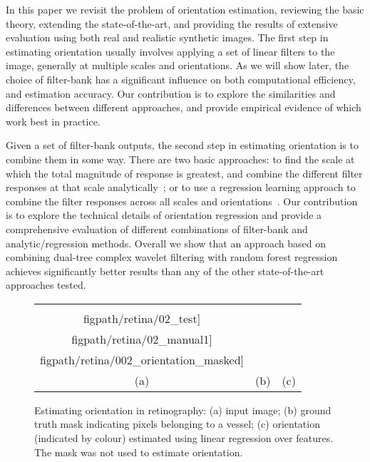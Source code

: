 In this paper we revisit the problem of orientation estimation, reviewing the basic theory, extending the state-of-the-art, and providing the results of extensive evaluation using both real and realistic synthetic images. The first step in estimating orientation usually involves applying a set of linear filters to the image, generally at multiple scales and orientations. As we will show later, the choice of filter-bank has a significant influence on both computational efficiency, and estimation accuracy. Our contribution is to explore the similarities and differences between different approaches, and provide empirical evidence of which work best in practice.

Given a set of filter-bank outputs, the second step in estimating orientation is to combine them in some way. There are two basic approaches: to find the scale at which the total magnitude of response is greatest, and combine the different filter responses at that scale analytically~\cite{Karssemeijer_teBrake_TMI96,Mei_etal_IVC09}; or to use a regression learning approach to combine the filter responses across all scales and orientations~\cite{Berks_etal_IPMI11}. Our contribution is to explore the technical details of orientation regression and provide a comprehensive evaluation of different combinations of filter-bank and analytic/regression methods. Overall we show that an approach based on combining dual-tree complex wavelet filtering with random forest regression achieves significantly better results than any of the other state-of-the-art approaches tested.

\begin{figure}[t]
\centering
\begin{tabular}{c c c}
\texttt{[image: \\figpath/retina/02\_test]} &
\texttt{[image: \\figpath/retina/02\_manual1]} &
\texttt{[image: \\figpath/retina/002\_orientation\_masked]} \\
(a) & (b) & (c) \\
\end{tabular}
%
\caption{Estimating orientation in retinography: %
(a) input image; %
(b) ground truth mask indicating pixels belonging to a vessel; %
(c) orientation (indicated by colour) estimated using linear regression over \dtcwt{} features. The mask was not used to estimate orientation. %
}
\label{f:retinography}
\end{figure}




